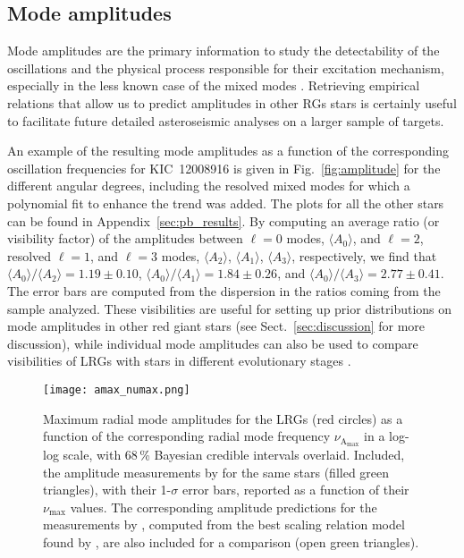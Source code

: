\documentclass[structabstract]{aa}
\newcommand{\numax}{\nu_\mathrm{max}}
\newcommand{\kic}{KIC~12008916}
\begin{document}
\subsection{Mode amplitudes}
\label{sec:amplitudes}
Mode amplitudes are the primary information to study the detectability of the oscillations and the physical process responsible for their excitation mechanism, especially in the less known case of the mixed modes \citep[e.g.][]{Grosjean14}. Retrieving empirical relations that allow us to predict amplitudes in other RGs stars \citep[e.g.][and references therein]{Corsaro13} is certainly useful to facilitate future detailed asteroseismic analyses on a larger sample of targets.

An example of the resulting mode amplitudes as a function of the corresponding oscillation frequencies for \kic\,\,is given in Fig.~\ref{fig:amplitude} for the different angular degrees, including the resolved mixed modes for which a polynomial fit to enhance the trend was added. The plots for all the other stars can be found in Appendix~\ref{sec:pb_results}. By computing an average ratio (or visibility factor) of the amplitudes between $\ell = 0$ modes, $\langle A_0 \rangle$, and $\ell = 2$, resolved $\ell = 1$, and $\ell = 3$ modes, $\langle A_2 \rangle$, $\langle A_1 \rangle$, $\langle A_3 \rangle$, respectively, we find that $\langle A_0 \rangle / \langle A_2 \rangle = 1.19 \pm 0.10$, $\langle A_0 \rangle / \langle A_1 \rangle = 1.84 \pm 0.26$, and $\langle A_0 \rangle / \langle A_3 \rangle = 2.77 \pm 0.41$. The error bars are computed from the dispersion in the ratios coming from the sample analyzed. These visibilities are useful for setting up prior distributions on mode amplitudes in other red giant stars (see Sect.~\ref{sec:discussion} for more discussion), while individual mode amplitudes can also be used to compare visibilities of LRGs with stars in different evolutionary stages \citep[e.g.][]{Ballot11visibility,Benomar13}.

\begin{figure}
   \centering
   \texttt{[image: amax\_numax.png]}
      \caption{Maximum radial mode amplitudes for the LRGs (red circles) as a function of the corresponding radial mode frequency $\nu_\mathrm{A_\mathrm{max}}$ in a log-log scale, with 68\,\% Bayesian credible intervals overlaid. Included, the amplitude measurements by \cite{Huber11} for the same stars (filled green triangles), with their 1-$\sigma$ error bars, reported as a function of their $\numax$ values. The corresponding amplitude predictions for the measurements by \cite{Huber11}, computed from the best scaling relation model found by \cite{Corsaro13}, are also included for a comparison (open green triangles).}
    \label{fig:amax}
\end{figure}
\end{document}
